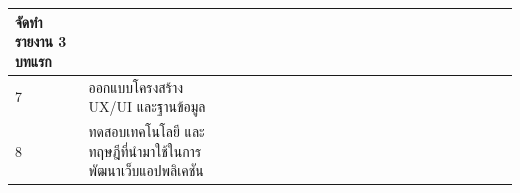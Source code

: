 \documentclass[12pt,oneside,openright,a4paper]{cpe-thai-project}
\begin{document}
\begin{table}[!h]
{\begin{tabular}{|llllllllllllllllllllll|}
      \multicolumn{1}{l|}{จัดทำรายงาน   3 บทแรก} &
      \multicolumn{1}{l|}{} &
      \multicolumn{1}{l|}{} &
      \multicolumn{1}{l|}{} &
      \multicolumn{1}{l|}{} &
      \multicolumn{1}{l|}{\cellcolor[HTML]{FFCE93}} &
      \multicolumn{1}{l|}{\cellcolor[HTML]{FFCE93}} &
      \multicolumn{1}{l|}{\cellcolor[HTML]{FFCE93}} &
      \multicolumn{1}{l|}{\cellcolor[HTML]{FFCE93}} &
      \multicolumn{1}{l|}{\cellcolor[HTML]{FFCE93}} &
      \multicolumn{1}{l|}{\cellcolor[HTML]{FFCE93}} &
      \multicolumn{1}{l|}{\cellcolor[HTML]{FFCE93}} &
      \multicolumn{1}{l|}{\cellcolor[HTML]{FFCE93}} &
      \multicolumn{1}{l|}{\cellcolor[HTML]{FFCE93}} &
      \multicolumn{1}{l|}{\cellcolor[HTML]{FFCE93}} &
      \multicolumn{1}{l|}{\cellcolor[HTML]{FFCE93}} &
      \multicolumn{1}{l|}{} &
      \multicolumn{1}{l|}{} &
      \multicolumn{1}{l|}{} &
      \multicolumn{1}{l|}{} &
       \\ \hline
    \multicolumn{1}{|l|}{7} &
      \multicolumn{1}{l|}{ออกแบบโครงสร้าง UX/UI และฐานข้อมูล} &
      \multicolumn{1}{l|}{} &
      \multicolumn{1}{l|}{} &
      \multicolumn{1}{l|}{} &
      \multicolumn{1}{l|}{} &
      \multicolumn{1}{l|}{} &
      \multicolumn{1}{l|}{\cellcolor[HTML]{FFCE93}} &
      \multicolumn{1}{l|}{\cellcolor[HTML]{FFCE93}} &
      \multicolumn{1}{l|}{\cellcolor[HTML]{FFCE93}} &
      \multicolumn{1}{l|}{\cellcolor[HTML]{FFCE93}} &
      \multicolumn{1}{l|}{\cellcolor[HTML]{FFCE93}} &
      \multicolumn{1}{l|}{\cellcolor[HTML]{FFCE93}} &
      \multicolumn{1}{l|}{\cellcolor[HTML]{FFCE93}} &
      \multicolumn{1}{l|}{\cellcolor[HTML]{FFCE93}} &
      \multicolumn{1}{l|}{\cellcolor[HTML]{FFCE93}} &
      \multicolumn{1}{l|}{\cellcolor[HTML]{FFCE93}} &
      \multicolumn{1}{l|}{\cellcolor[HTML]{FFCE93}} &
      \multicolumn{1}{l|}{\cellcolor[HTML]{FFCE93}} &
      \multicolumn{1}{l|}{\cellcolor[HTML]{FFCE93}} &
      \multicolumn{1}{l|}{\cellcolor[HTML]{FFCE93}} &
      \cellcolor[HTML]{FFCE93} \\ \hline
    \multicolumn{1}{|l|}{8} &
      \multicolumn{1}{l|}{ทดสอบเทคโนโลยี และทฤษฎีที่นำมาใช้ในการพัฒนาเว็บแอปพลิเคชัน} &
      \multicolumn{1}{l|}{} &
      \multicolumn{1}{l|}{} &
      \multicolumn{1}{l|}{} &
      \multicolumn{1}{l|}{} &
      \multicolumn{1}{l|}{} &
      \multicolumn{1}{l|}{\cellcolor[HTML]{FFCE93}} &
      \multicolumn{1}{l|}{\cellcolor[HTML]{FFCE93}} &
      \multicolumn{1}{l|}{\cellcolor[HTML]{FFCE93}} &
      \multicolumn{1}{l|}{\cellcolor[HTML]{FFCE93}} &
      \multicolumn{1}{l|}{\cellcolor[HTML]{FFCE93}} &
      \multicolumn{1}{l|}{\cellcolor[HTML]{FFCE93}} &

\end{tabular}}
\end{table}
\end{document}
